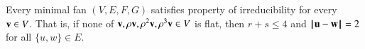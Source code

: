 %
%
%



\begin{lemma}
Every minimal fan $(V,E,F,G)$ satisfies property  of irreducibility for every $\v\in V$.
That is, if none of $\v,\rho \v,\rho^2 \v,\rho^3 \v\in V$ is flat, then $r+s\le 4$
and $\norm{\u}{\w}=2$ for all $\{u,w\}\in E$.
\end{lemma}

